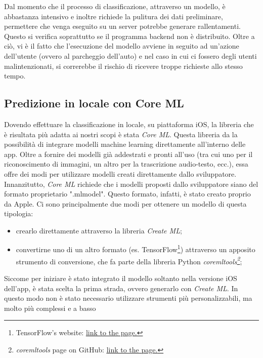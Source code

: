 Dal momento che il processo di classificazione, attraverso un modello, è 
abbastanza intensivo e inoltre richiede la pulitura dei dati preliminare,
permettere che venga eseguito su un server potrebbe generare rallentamenti.
Questo si verifica soprattutto se il programma backend non è distribuito.
Oltre a ciò, vi è il fatto che l'esecuzione del modello avviene in seguito
ad un'azione dell'utente (ovvero al parcheggio dell'auto) e nel caso in cui 
ci fossero degli utenti malintenzionati, si correrebbe il rischio di
ricevere troppe richieste allo stesso tempo.

\subsection{Predizione in locale con Core ML}

Dovendo effettuare la classificazione in locale, su piattaforma iOS, la 
libreria che è risultata più adatta ai nostri scopi è stata \emph{Core ML}.
Questa libreria da la possibilità di integrare modelli machine learning 
direttamente all'interno delle app. Oltre a fornire dei modelli già 
addestrati e pronti all'uso (tra cui uno per il riconoscimento di immagini,
un altro per la trascrizione audio-testo, ecc.), essa offre dei modi per 
utilizzare modelli creati direttamente dallo sviluppatore.\\
Innanzitutto, \emph{Core ML} richiede che i modelli proposti dallo
sviluppatore siano del formato proprietario ".mlmodel". Questo formato,
infatti, è stato creato proprio da Apple. Ci sono principalmente due 
modi per ottenere un modello di questa tipologia:
\begin{itemize}
    \item crearlo direttamente attraverso la libreria \emph{Create ML};
    \item convertirne uno di un altro formato (es. TensorFlow\footnote{
    TensorFlow's website: 
    \href{https://www.tensorflow.org}{\underline{link to the page.}}}) attraverso 
    un apposito strumento di conversione, che fa parte della libreria Python
    \emph{coremltools\footnote{
    \emph{coremltools} page on GitHub: 
    \href{https://apple.github.io/coremltools/}{\underline{link to the page.}}}};
\end{itemize}
Siccome per iniziare è stato integrato il modello soltanto nella versione
iOS dell'app, è stata scelta la prima strada, ovvero generarlo con
\emph{Create ML}. In questo modo non è stato necessario utilizzare
strumenti più personalizzabili, ma molto più complessi e a basso
